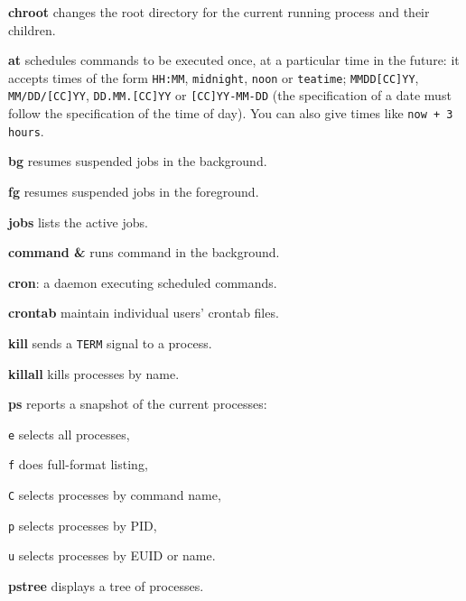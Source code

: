 \begin{enumx}
	\item [\cmd] \textbf{chroot} changes the root directory 
	for the current running process and their children.
\end{enumx}

\begin{enumx}
	\item [\cmd] \textbf{at} schedules commands to be executed once, 
	at a particular time in the future: it accepts times of the form 
	\texttt{HH:MM}, \texttt{midnight}, \texttt{noon} or \texttt{teatime}; 
	\texttt{MMDD[CC]YY}, \texttt{MM/DD/[CC]YY}, \texttt{DD.MM.[CC]YY} or 
	\texttt{[CC]YY-MM-DD} (the specification of a date 
	must follow the specification of the time of day).
	You can also give times like \texttt{now + 3 hours}.
\end{enumx}

\begin{enumx}
	\item [\cmd] \textbf{bg} resumes suspended jobs in the background.
	\item [\cmd] \textbf{fg} resumes suspended jobs in the foreground.
	\item [\cmd] \textbf{jobs} lists the active jobs.
	\item [\cmd] \textbf{command \&} runs command in the background.
\end{enumx}

\begin{enumx}
	\item [\cmd] \textbf{cron}: a daemon executing scheduled commands.
	\item [\cmd] \textbf{crontab} maintain individual users' crontab files.
\end{enumx}

\begin{enumx}
	\item [\cmd] \textbf{kill} sends a \texttt{TERM} signal to a process.
	\item [\cmd] \textbf{killall} kills processes by name.
\end{enumx}

\begin{enumx}
	\item [\cmd] \textbf{ps} reports a snapshot of the current processes:
	\item [\texttt{e}] selects all processes,
	\item [\texttt{f}] does full-format listing,
	\item [\texttt{C}] selects processes by command name,
	\item [\texttt{p}] selects processes by PID,
	\item [\texttt{u}] selects processes by EUID or name. 
	\item [\cmd] \textbf{pstree} displays a tree of processes.
\end{enumx}

